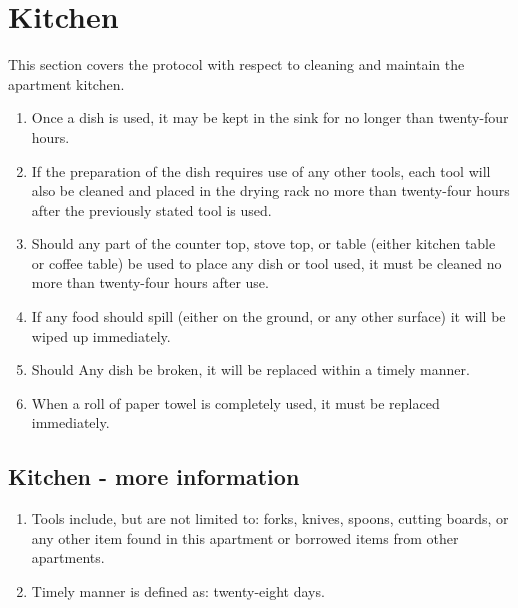 \documentclass[10pt]{article}
\begin{document}
\section{Kitchen} \label{Kitchen}
This section covers the protocol with respect to cleaning and maintain the apartment kitchen.
\begin{enumerate}
	\item Once a dish is used, it may be kept in the sink for no longer than twenty-four hours.
	\item If the preparation of the dish requires use of any other tools, each tool will also be cleaned and placed in the drying rack no more than twenty-four hours after the previously stated tool is used. 
	\item Should any part of the counter top, stove top, or table (either kitchen table or coffee table) be used to place any dish or tool used, it must be cleaned no more than twenty-four hours after use.
	\item If any food should spill (either on the ground, or any other surface) it will be wiped up immediately.
	\item Should Any dish be broken, it will be replaced within a timely manner.
	\item When a roll of paper towel is completely used, it must be replaced immediately.
	
\end{enumerate}
\subsection{Kitchen - more information}
\begin{enumerate}
	\item Tools include, but are not limited to: forks, knives, spoons, cutting boards, or any other item found in this apartment or borrowed items from other apartments.
	\item Timely manner is defined as: twenty-eight days.
	
\end{enumerate}
\end{document}
